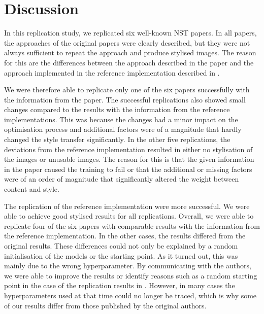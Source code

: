 \section{Discussion}

In this replication study, we replicated six well-known \gls{NST} papers. In all papers, the approaches of the original papers were clearly described, but they were not always sufficient to repeat the approach and produce stylised images. The reason for this are the differences between the approach described in the paper and the approach implemented in the reference implementation described in . 

We were therefore able to replicate only one of the six papers successfully with the information from the paper. The successful replications also showed small changes compared to the results with the information from the reference implementations. This was because the changes had a minor impact on the optimisation process and additional factors were of a magnitude that hardly changed the style transfer significantly. In the other five replications, the deviations from the reference implementation resulted in either no stylisation of the images or unusable images. The reason for this is that the given information in the paper caused the training to fail or that the additional or missing factors were of an order of magnitude that significantly altered the weight between content and style.

The replication of the reference implementation were more successful. We were able to achieve good stylised results for all replications. Overall, we were able to replicate four of the six papers with comparable results with the information from the reference implementation. In the other cases, the results differed from the original results. These differences could not only be explained by a random initialisation of the models or the starting point. As it turned out, this was mainly due to the wrong hyperparameter. By communicating with the authors, we were able to improve the results or identify reasons such as a random starting point in the case of the replication results in . However, in many cases the hyperparameters used at that time could no longer be traced, which is why some of our results differ from those published by the original authors.


